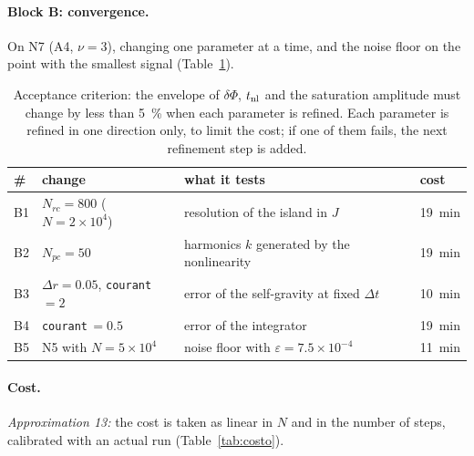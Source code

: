 \documentclass[11pt,a4paper]{article}
\begin{document}
\paragraph{Block B: convergence.} On N7 (A4, $\nu=3$), changing one parameter at a time, and
the noise floor on the point with the smallest signal (Table~\ref{tab:convergencia}).

\begin{table}[!htbp]
\centering
\begin{tabular}{llll}
\toprule
\# & change & what it tests & cost\\
\midrule
B1 & $N_{rc}=800$ ($N=2\times10^4$) & resolution of the island in $J$ & \SI{19}{min}\\
B2 & $N_{pc}=50$ & harmonics $k$ generated by the nonlinearity & \SI{19}{min}\\
B3 & $\Delta r=0.05$, \texttt{courant}\,$=2$ & error of the self-gravity at fixed $\Delta t$ & \SI{10}{min}\\
B4 & \texttt{courant}\,$=0.5$ & error of the integrator & \SI{19}{min}\\
B5 & N5 with $N=5\times10^4$ & noise floor with $\varepsilon=7.5\times10^{-4}$ & \SI{11}{min}\\
\bottomrule
\end{tabular}
\caption{Acceptance criterion: the envelope of $\delta\Phi$, $t_{\rm nl}$ and the saturation
amplitude must change by less than \SI{5}{\%} when each parameter is refined. Each
parameter is refined in one direction only, to limit the cost; if one of them fails, the
next refinement step is added.}
\label{tab:convergencia}
\end{table}

\paragraph{Cost.} \emph{Approximation 13:} the cost is taken as linear in $N$ and in the number
of steps, calibrated with an actual run (Table~\ref{tab:costo}).
\end{document}

